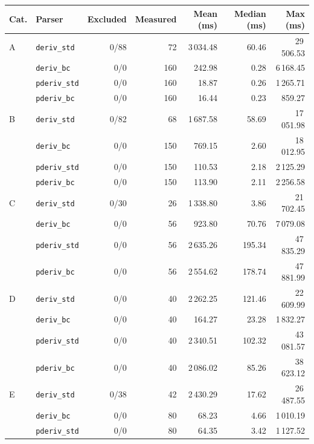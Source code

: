 \begin{table}[H]
\centering
\small
\setlength{\tabcolsep}{4pt}
\begin{tabular*}{\textwidth}{@{\extracolsep{\fill}} llrrrrr}
\hline
Cat. & Parser & Excluded & Measured & Mean (ms) & Median (ms) & Max (ms) \\
\hline
A & \texttt{deriv\_std} &  0/88 &  72 & 3\,034.48 &   60.46 & 29\,506.53 \\
  & \texttt{deriv\_bc}        &  0/0 & 160 &   242.98 &    0.28 &  6\,168.45 \\
  & \texttt{pderiv\_std}      &  0/0 & 160 &    18.87 &    0.26 &  1\,265.71 \\
  & \texttt{pderiv\_bc}       &  0/0 & 160 &    16.44 &    0.23 &    859.27 \\
\hline
B & \texttt{deriv\_std} &  0/82 &  68 & 1\,687.58 &   58.69 & 17\,051.98 \\
  & \texttt{deriv\_bc}        &  0/0 & 150 &   769.15 &    2.60 & 18\,012.95 \\
  & \texttt{pderiv\_std}      &  0/0 & 150 &   110.53 &    2.18 &  2\,125.29 \\
  & \texttt{pderiv\_bc}       &  0/0 & 150 &   113.90 &    2.11 &  2\,256.58 \\
\hline
C & \texttt{deriv\_std} &  0/30 &  26 & 1\,338.80 &    3.86 & 21\,702.45 \\
  & \texttt{deriv\_bc}        &  0/0 &  56 &   923.80 &   70.76 &  7\,079.08 \\
  & \texttt{pderiv\_std}      &  0/0 &  56 & 2\,635.26 &  195.34 & 47\,835.29 \\
  & \texttt{pderiv\_bc}       &  0/0 &  56 & 2\,554.62 &  178.74 & 47\,881.99 \\
\hline
D & \texttt{deriv\_std} &  0/0 &  40 & 2\,262.25 &  121.46 & 22\,609.99 \\
  & \texttt{deriv\_bc}        &  0/0 &  40 &   164.27 &   23.28 &  1\,832.27 \\
  & \texttt{pderiv\_std}      &  0/0 &  40 & 2\,340.51 &  102.32 & 43\,081.57 \\
  & \texttt{pderiv\_bc}       &  0/0 &  40 & 2\,086.02 &   85.26 & 38\,623.12 \\
\hline
E & \texttt{deriv\_std} &  0/38 &  42 & 2\,430.29 &   17.62 & 26\,487.55 \\
  & \texttt{deriv\_bc}        &  0/0 &  80 &    68.23 &    4.66 &  1\,010.19 \\
  & \texttt{pderiv\_std}      &  0/0 &  80 &    64.35 &    3.42 &  1\,127.52 \\

\end{tabular*}
\end{table}
